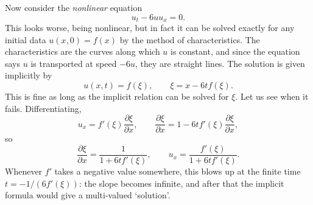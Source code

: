 \documentclass[a4paper]{scrartcl}
\begin{document}
\begin{example}
	Now consider the \emph{nonlinear} equation
	$$
	u_t - 6uu_x = 0.
	$$
	This looks worse, being nonlinear, but in fact it can be solved exactly for any initial data $u(x,0) = f(x)$ by the method of characteristics. The characteristics are the curves along which $u$ is constant, and since the equation says $u$ is transported at speed $-6u$, they are straight lines. The solution is given implicitly by
	$$
	u(x,t) = f(\xi), \qquad \xi = x - 6tf(\xi).
	$$
	This is fine as long as the implicit relation can be solved for $\xi$. Let us see when it fails. Differentiating,
	$$
	u_x = f'(\xi)\frac{\partial\xi}{\partial x}, \qquad \frac{\partial \xi}{\partial x} = 1 - 6tf'(\xi)\frac{\partial\xi}{\partial x},
	$$
	so
	$$
	\frac{\partial \xi}{\partial x} = \frac{1}{1 + 6tf'(\xi)}, \qquad u_x = \frac{f'(\xi)}{1 + 6tf'(\xi)}.
	$$
	Whenever $f'$ takes a negative value somewhere, this blows up at the finite time $t = -1/(6f'(\xi))$: the slope becomes infinite, and after that the implicit formula would give a multi-valued `solution'.
	\begin{center}
\end{center}
\end{example}
\end{document}
